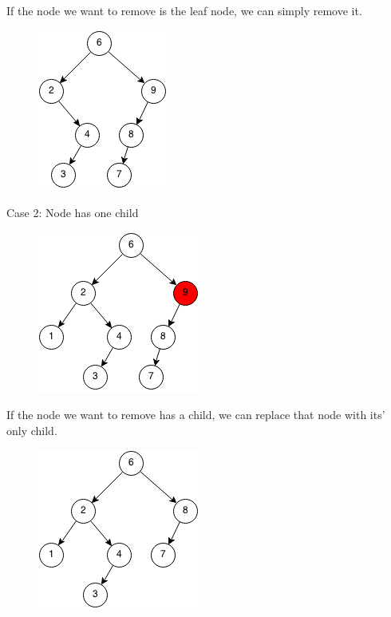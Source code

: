 \documentclass[11pt,oneside]{book}
\makeatletter
\def\maxwidth#1{\ifdim\Gin@nat@width>#1 #1\else\Gin@nat@width\fi}
\makeatother
\begin{document}
If the node we want to remove is the leaf node, we can simply remove it.

\vspace{5px}\begin{figure}[H]\centering
        \includegraphics[width=0.66\maxwidth{\textwidth}]{bst-rem-case12.png}
        \end{figure}

Case 2: Node has one child

\vspace{5px}\begin{figure}[H]\centering
        \includegraphics[width=0.66\maxwidth{\textwidth}]{bst-rem-case21.png}
        \end{figure}

If the node we want to remove has a child, we can replace that node with its' only child.

\vspace{5px}\begin{figure}[H]\centering
        \includegraphics[width=0.66\maxwidth{\textwidth}]{bst-rem-case22.png}
        \end{figure}
\end{document}
